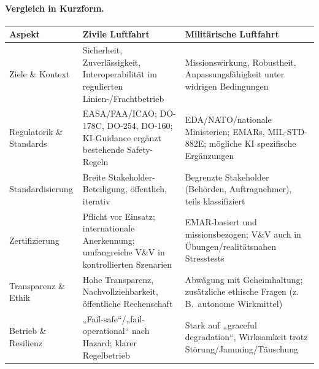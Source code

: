 \paragraph{Vergleich in Kurzform.}
\begin{center}
\begin{tabular}{p{} p{} p{}}
\toprule
\textbf{Aspekt} & \textbf{Zivile Luftfahrt} & \textbf{Militärische Luftfahrt} \\
\midrule
Ziele \& Kontext & Sicherheit, Zuverlässigkeit, Interoperabilität im regulierten Linien-/Frachtbetrieb & Missionswirkung, Robustheit, Anpassungsfähigkeit unter widrigen Bedingungen \\
Regulatorik \& Standards & EASA/FAA/ICAO; DO-178C, DO-254, DO-160; KI-Guidance ergänzt bestehende Safety-Regeln & EDA/NATO/nationale Ministerien; EMARs, MIL-STD-882E; mögliche KI spezifische Ergänzungen \\
Standardisierung & Breite Stakeholder-Beteiligung, öffentlich, iterativ & Begrenzte Stakeholder (Behörden, Auftragnehmer), teils klassifiziert \\
Zertifizierung & Pflicht vor Einsatz; internationale Anerkennung; umfangreiche V\&V in kontrollierten Szenarien & EMAR-basiert und missionsbezogen; V\&V auch in Übungen/realitätsnahen Stresstests \\
Transparenz \& Ethik & Hohe Transparenz, Nachvollziehbarkeit, öffentliche Rechenschaft & Abwägung mit Geheimhaltung; zusätzliche ethische Fragen (z.\,B.\ autonome Wirkmittel) \\
Betrieb \& Resilienz & „Fail-safe“/„fail-operational“ nach Hazard; klarer Regelbetrieb & Stark auf „graceful degradation“, Wirksamkeit trotz Störung/Jamming/Täuschung \\
\bottomrule
\end{tabular}
\end{center}

